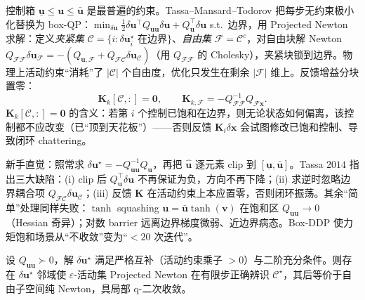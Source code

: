 控制箱 $\underline{\mathbf{u}}\le\mathbf{u}\le\bar{\mathbf{u}}$ 是最普遍的约束。Tassa--Mansard--Todorov 把每步无约束极小化替换为 box-QP\cite{tassa2014ddp}：$\min_{\delta\mathbf{u}}\tfrac12\delta\mathbf{u}^\top Q_{\mathbf{uu}}\delta\mathbf{u}+Q_{\mathbf{u}}^\top\delta\mathbf{u}$ s.t.\ 边界，用 Projected Newton 求解：定义\emph{夹紧集} $\mathcal{C}=\{i:\delta\mathbf{u}_i^\star\text{ 在边界}\}$、\emph{自由集} $\mathcal{F}=\mathcal{C}^c$，对自由块解 Newton $Q_{\mathcal{FF}}\delta\mathbf{u}_{\mathcal{F}}=-(Q_{\mathbf{u},\mathcal{F}}+Q_{\mathcal{FC}}\delta\mathbf{u}_{\mathcal{C}})$（用 $Q_{\mathcal{FF}}$ 的 Cholesky），夹紧块锁到边界。物理上活动约束“消耗”了 $|\mathcal{C}|$ 个自由度，优化只发生在剩余 $|\mathcal{F}|$ 维上。反馈增益分块置零：
\begin{equation}
  \mathbf{K}_k[\mathcal{C},:]=\mathbf{0},\qquad \mathbf{K}_{k,\mathcal{F}}=-Q_{\mathcal{FF}}^{-1}Q_{\mathcal{F}\mathbf{x}}.
  \label{eq:ddp-box-K}
\end{equation}
$\mathbf{K}_k[\mathcal{C},:]=\mathbf{0}$ 的含义：若第 $i$ 个控制已饱和在边界，则无论状态如何偏离，该控制都不应改变（已“顶到天花板”）——否则反馈 $\mathbf{K}_i\delta\mathbf{x}$ 会试图修改已饱和控制、导致闭环 chattering。

\begin{pitfall}
新手直觉：照常求 $\delta\mathbf{u}^\star=-Q_{\mathbf{uu}}^{-1}Q_{\mathbf{u}}$，再把 $\hat{\mathbf{u}}$ 逐元素 clip 到 $[\underline{\mathbf{u}},\bar{\mathbf{u}}]$。Tassa $2014$ 指出三大缺陷：(i) clip 后 $Q_{\mathbf{u}}^\top\delta\mathbf{u}$ 不再保证为负，方向不再下降；(ii) 求逆时忽略边界耦合项 $Q_{\mathcal{FC}}\delta\mathbf{u}_{\mathcal{C}}$；(iii) 反馈 $\mathbf{K}$ 在活动约束上本应置零，否则闭环振荡。其余“简单”处理同样失败：$\tanh$ squashing $\mathbf{u}=\bar{\mathbf{u}}\tanh(\mathbf{v})$ 在饱和区 $Q_{\mathbf{uu}}\to0$（Hessian 奇异）；对数 barrier 远离边界梯度微弱、近边界病态。Box-DDP 使力矩饱和场景从“不收敛”变为“$<20$ 次迭代”。
\end{pitfall}

\begin{theorem}
\label{thm:ddp-box-conv}
设 $Q_{\mathbf{uu}}\succ0$，解 $\delta\mathbf{u}^\star$ 满足严格互补（活动约束乘子 $>0$）与二阶充分条件。则存在 $\delta\mathbf{u}^\star$ 邻域使 $\varepsilon$-活动集 Projected Newton 在有限步正确辨识 $\mathcal{C}^\star$，其后等价于自由子空间纯 Newton，具局部 q-二次收敛\cite{bertsekas1982projected}。
\end{theorem}

